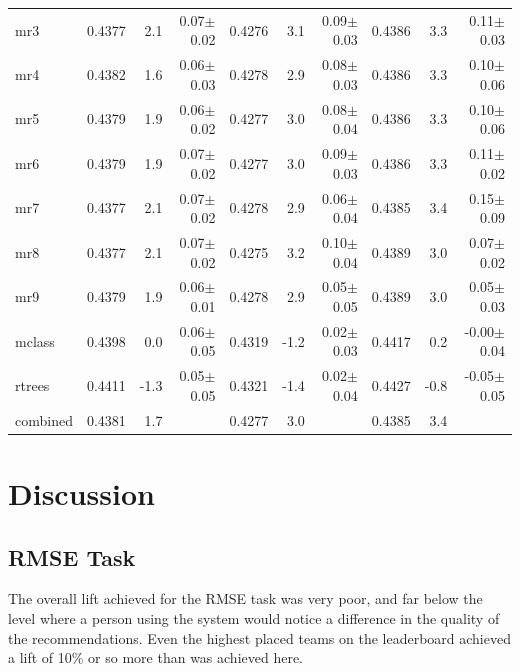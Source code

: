 \documentclass{article}
\begin{document}
\begin{table}[b]
\begin{center}
\begin{small}
\begin{sc}
\begin{tabular}{l|rr r|rr r|rr r}
mr3        & 0.4377 &   2.1 &  0.07$\pm$0.02& 0.4276 &   3.1 &  0.09$\pm$0.03& 0.4386 &   3.3 &  0.11$\pm$0.03 \\ 
mr4        & 0.4382 &   1.6 &  0.06$\pm$0.03& 0.4278 &   2.9 &  0.08$\pm$0.03& 0.4386 &   3.3 &  0.10$\pm$0.06 \\ 
mr5        & 0.4379 &   1.9 &  0.06$\pm$0.02& 0.4277 &   3.0 &  0.08$\pm$0.04& 0.4386 &   3.3 &  0.10$\pm$0.06 \\ 
mr6        & 0.4379 &   1.9 &  0.07$\pm$0.02& 0.4277 &   3.0 &  0.09$\pm$0.03& 0.4386 &   3.3 &  0.11$\pm$0.02 \\ 
mr7        & 0.4377 &   2.1 &  0.07$\pm$0.02& 0.4278 &   2.9 &  0.06$\pm$0.04& 0.4385 &   3.4 &  0.15$\pm$0.09 \\ 
mr8        & 0.4377 &   2.1 &  0.07$\pm$0.02& 0.4275 &   3.2 &  0.10$\pm$0.04& 0.4389 &   3.0 &  0.07$\pm$0.02 \\ 
mr9        & 0.4379 &   1.9 &  0.06$\pm$0.01& 0.4278 &   2.9 &  0.05$\pm$0.05& 0.4389 &   3.0 &  0.05$\pm$0.03 \\ 
\abovespace
mclass     & 0.4398 &   0.0 &  0.06$\pm$0.05& 0.4319 &  -1.2 &  0.02$\pm$0.03& 0.4417 &   0.2 & -0.00$\pm$0.04 \\ 
rtrees     & 0.4411 &  -1.3 &  0.05$\pm$0.05& 0.4321 &  -1.4 &  0.02$\pm$0.04& 0.4427 &  -0.8 & -0.05$\pm$0.05 \\ 
\abovespace\belowspace
combined   & 0.4381 &   1.7 &  & 0.4277 &   3.0 &  & 0.4385 &   3.4 &   \\ 
\hline
\end{tabular}
\end{sc}
\end{small}
\end{center}
\vskip -0.1in
\end{table}

\section{Discussion}

\subsection{RMSE Task}

The overall lift achieved for the RMSE task was very poor, and far below the level where a person using the system would notice a difference in the quality of the recommendations.  Even the highest placed teams on the leaderboard achieved a lift of 10\% or so more than was achieved here.
\end{document}
